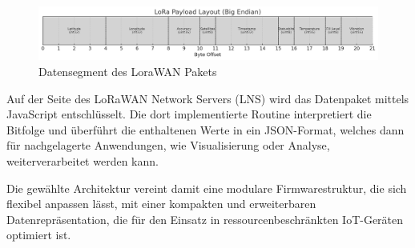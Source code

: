 \begin{figure}[H]
\centering
\includegraphics[scale=.5]{figures/asstes/lorawan-packet-layout.png}
\caption{Datensegment des LoraWAN Pakets}
\label{fig:lorawanPacket}
\end{figure}

Auf der Seite des LoRaWAN Network Servers (LNS) wird das Datenpaket mittels JavaScript entschlüsselt. Die dort implementierte Routine interpretiert die Bitfolge und überführt die enthaltenen Werte in ein JSON-Format, welches dann für nachgelagerte Anwendungen, wie Visualisierung oder Analyse, weiterverarbeitet werden kann. 

Die gewählte Architektur vereint damit eine modulare Firmwarestruktur, die sich flexibel anpassen lässt, mit einer kompakten und erweiterbaren Datenrepräsentation, die für den Einsatz in ressourcenbeschränkten IoT-Geräten optimiert ist.